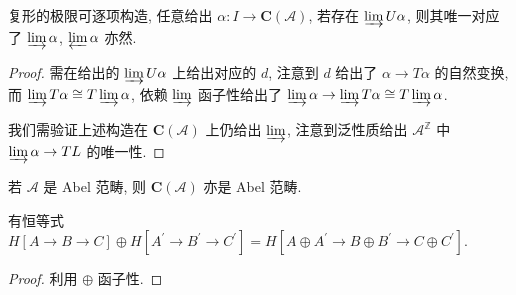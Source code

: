 \begin{lemma}
    复形的极限可逐项构造, 任意给出 \(\alpha : I \to \mathbf{C}(\mathcal{A})\),
    若存在 \(\varinjlim U \alpha\), 则其唯一对应了 \(\varinjlim \alpha\), \(\varprojlim \alpha\) 亦然.

    \begin{proof}
        需在给出的 \(\varinjlim U \alpha\) 上给出对应的 \(d\), 注意到 \(d\) 给出了 \(\alpha \to T \alpha\) 的自然变换,
        而 \(\varinjlim T \alpha \cong T \varinjlim \alpha\), 依赖 \(\varinjlim\) 函子性给出了 \(\varinjlim \alpha \to \varinjlim T \alpha \cong T \varinjlim \alpha\).

        我们需验证上述构造在 \(\mathbf{C} (\mathcal{A})\) 上仍给出 \(\varinjlim\), 注意到泛性质给出 \(\mathcal{A}^\mathbb{Z}\) 中 \(\varinjlim \alpha \to T L\) 的唯一性.
    \end{proof}
\end{lemma}

\begin{corollary}
    若 \(\mathcal{A}\) 是 Abel 范畴, 则 \(\mathbf{C} (\mathcal{A})\) 亦是 Abel 范畴.
\end{corollary}

\begin{lemma}
    有恒等式 \(H [A \to B \to C] \oplus H [A^\prime \to B^\prime \to C^\prime] = H [A \oplus A^\prime \to B \oplus B^\prime \to C \oplus C^\prime]\).

    \begin{proof}
        利用 \(\oplus\) 函子性.
    \end{proof}
\end{lemma}

